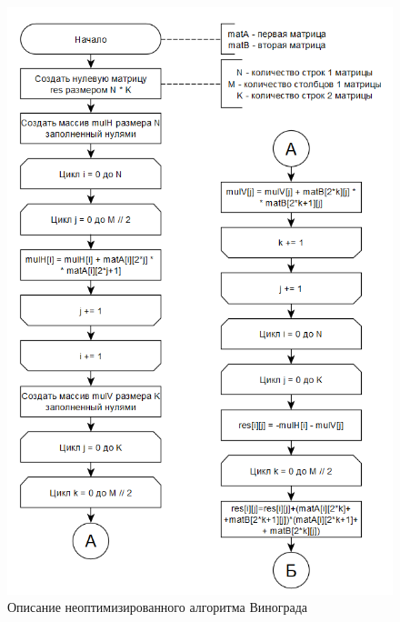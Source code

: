 \documentclass{article}
\begin{document}
\begin{figure}[h]
	\centering
	\includegraphics[scale=1]{tools/alg_2.png}
	\caption{Описание неоптимизированного алгоритма Винограда}
	\label{fig:vinograd_1}
\end{figure}
\end{document}
